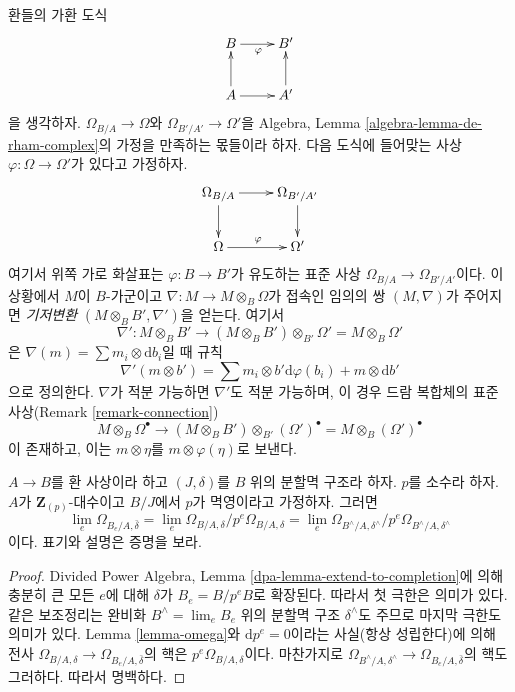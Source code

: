 \begin{remark}
\label{remark-base-change-connection}
환들의 가환 도식
$$
\xymatrix{
B \ar[r]_\varphi & B' \\
A \ar[u] \ar[r] & A' \ar[u]
}
$$
을 생각하자. $\Omega_{B/A} \to \Omega$와
$\Omega_{B'/A'} \to \Omega'$을 Algebra,
Lemma \ref{algebra-lemma-de-rham-complex}의 가정을 만족하는 몫들이라 하자.
다음 도식에 들어맞는 사상 $\varphi : \Omega \to \Omega'$가
있다고 가정하자.
$$
\xymatrix{
\Omega_{B/A} \ar[r] \ar[d] &
\Omega_{B'/A'} \ar[d] \\
\Omega \ar[r]^{\varphi} &
\Omega'
}
$$
여기서 위쪽 가로 화살표는 $\varphi : B \to B'$가 유도하는 표준 사상
$\Omega_{B/A} \to \Omega_{B'/A'}$이다. 이 상황에서 $M$이
$B$-가군이고 $\nabla : M \to M \otimes_B \Omega$가 접속인 임의의 쌍
$(M, \nabla)$가 주어지면 {\it 기저변환} $(M \otimes_B B', \nabla')$을
얻는다. 여기서
$$
\nabla' :
M \otimes_B B'
\longrightarrow
(M \otimes_B B') \otimes_{B'} \Omega' = M \otimes_B \Omega'
$$
은 $\nabla(m) = \sum m_i \otimes \text{d}b_i$일 때 규칙
$$
\nabla'(m \otimes b') =
\sum m_i \otimes b'\text{d}\varphi(b_i) + m \otimes \text{d}b' 
$$
으로 정의한다. $\nabla$가 적분 가능하면 $\nabla'$도 적분 가능하며,
이 경우 드람 복합체의 표준 사상(Remark \ref{remark-connection})
\begin{equation}
\label{equation-base-change-map-complexes}
M \otimes_B \Omega^\bullet
\longrightarrow
(M \otimes_B B') \otimes_{B'} (\Omega')^\bullet =
M \otimes_B (\Omega')^\bullet
\end{equation}
이 존재하고, 이는 $m \otimes \eta$를 $m \otimes \varphi(\eta)$로 보낸다.
\end{remark}

\begin{lemma}
\label{lemma-differentials-completion}
$A \to B$를 환 사상이라 하고 $(J, \delta)$를 $B$ 위의 분할멱
구조라 하자. $p$를 소수라 하자. $A$가 $\mathbf{Z}_{(p)}$-대수이고
$B/J$에서 $p$가 멱영이라고 가정하자. 그러면
$$
\lim_e \Omega_{B_e/A, \bar\delta} =
\lim_e \Omega_{B/A, \delta}/p^e\Omega_{B/A, \delta} =
\lim_e \Omega_{B^\wedge/A, \delta^\wedge}/p^e \Omega_{B^\wedge/A, \delta^\wedge}
$$
이다. 표기와 설명은 증명을 보라.
\end{lemma}

\begin{proof}
Divided Power Algebra, Lemma \ref{dpa-lemma-extend-to-completion}에 의해
충분히 큰 모든 $e$에 대해 $\delta$가 $B_e = B/p^eB$로 확장된다.
따라서 첫 극한은 의미가 있다. 같은 보조정리는 완비화
$B^\wedge = \lim_e B_e$ 위의 분할멱 구조 $\delta^\wedge$도 주므로
마지막 극한도 의미가 있다. Lemma \ref{lemma-omega}와
$\text{d}p^e = 0$이라는 사실(항상 성립한다)에 의해 전사
$\Omega_{B/A, \delta} \to \Omega_{B_e/A, \bar\delta}$의 핵은
$p^e\Omega_{B/A, \delta}$이다. 마찬가지로
$\Omega_{B^\wedge/A, \delta^\wedge} \to
\Omega_{B_e/A, \bar\delta}$의 핵도 그러하다. 따라서 명백하다.
\end{proof}



